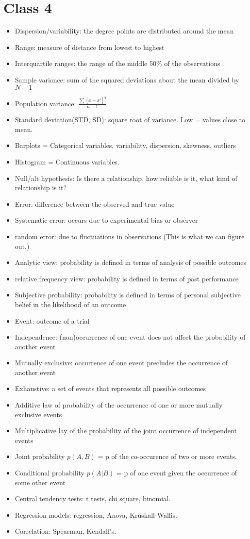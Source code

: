 \documentclass[11pt]{article}
\newenvironment{itemise}{
\begin{itemize}
  \setlength{\itemsep}{1pt}
  \setlength{\parskip}{0pt}
  \setlength{\parsep}{0pt}
}{\end{itemize}}
\begin{document}
\section*{Class 4}
\begin{itemise}
\item Dispersion/variability: the degree points are distributed around the mean
\item Range: measure of distance from lowest to highest
\item Interquartile ranges: the range of the middle 50\% of the observations
\item Sample variance: sum of the squared deviations about the mean divided by $N-1$
\item Population variance: $\frac{\sum[x-x\prime]^2}{n-1}$
\item Standard deviation(STD, SD): square root of variance. Low = values close to mean. 
\item Barplots = Categorical variables, variability, dispersion, skewness, outliers
\item Histogram = Continuous variables.
\item Null/alt hypothesis: Is there a relationship, how reliable is it, what kind of relationship is it?
\item Error: difference between the observed and true value
\item Systematic error: occurs due to experimental bias or observer
\item random error: due to fluctuations in observations (This is what we can figure out.) 
\item Analytic view: probability is defined in terms of analysis of possible outcomes
\item relative frequency view: probability is defined in terms of past performance
\item Subjective probability: probability is defined in terms of personal subjective belief in the likelihood of an outcome
\item Event: outcome of a trial
\item Independence: (non)occurrence of one event does not affect the probability of another event
\item Mutually exclusive: occurrence of one event precludes the occurrence of another event
\item Exhaustive: a set of events that represents all possible outcomes
\item Additive law of probability of the occurrence of one or more mutually exclusive events
\item Multiplicative lay of the probability of the joint occurrence of independent events
\item Joint probability $p(A,B)$ = p of the co-occurence of two or more events.
\item Conditional probability $p(A|B)$ = p of one event given the occurrence of some other event
\item Central tendency tests: t tests, chi square, binomial.
\item Regression models: regression, Anova, Kruskall-Wallis. 
\item Correlation: Spearman, Kendall's.
\end{itemise}
\end{document}
